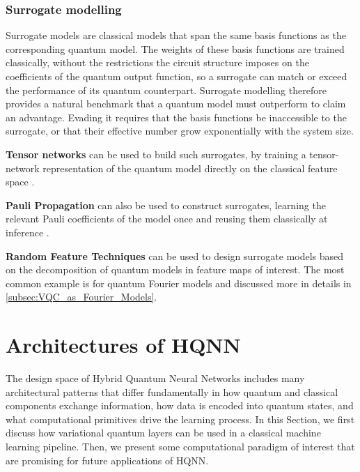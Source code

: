 \documentclass[aps,10pt,groupedaddress,prx,superscriptaddress,twocolumn,balancelastpage, tightenlines]{revtex4-2}
\theoremstyle{plain}  %
\begin{document}
    \subsubsection*{Surrogate modelling}

\noindent Surrogate models are classical models that span the same basis functions as the corresponding quantum model. The weights of these basis functions are trained classically, without the restrictions the circuit structure imposes on the coefficients of the quantum output function, so a surrogate can match or exceed the performance of its quantum counterpart. Surrogate modelling therefore provides a natural benchmark that a quantum model must outperform to claim an advantage. Evading it requires that the basis functions be inaccessible to the surrogate, or that their effective number grow exponentially with the system size.

\textbf{Tensor networks} can be used to build such surrogates, by training a tensor-network representation of the quantum model directly on the classical feature space \cite{shin_dequantizing_2024}.

\textbf{Pauli Propagation}  can also be used to construct surrogates, learning the relevant Pauli coefficients of the model once and reusing them classically at inference \cite{bermejo_quantum_2026}.

\textbf{Random Feature Techniques} can be used to design surrogate models based on the decomposition of quantum models in feature maps of interest. The most common example is for quantum Fourier models \cite{Schuld_2021_Effect, schuld2019quantum, sweke_potential_2025, landman_classically_2022} and discussed more in details in \autoref{subsec:VQC_as_Fourier_Models}.
        
\section{Architectures of HQNN}
\label{sec:architectures}

The design space of Hybrid Quantum Neural Networks includes many architectural patterns that differ fundamentally in how quantum and classical components exchange information, how data is encoded into quantum states, and what computational primitives drive the learning process. In this Section, we first discuss how variational quantum layers can be used in a classical machine learning pipeline. Then, we present some computational paradigm of interest that are promising for future applications of HQNN.
\end{document}
